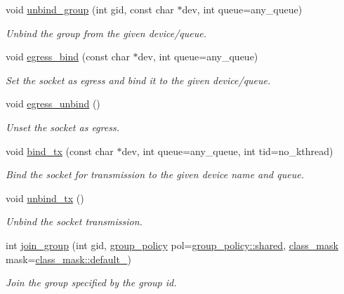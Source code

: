\begin{DoxyCompactItemize}
void \hyperlink{classpfq_1_1socket_a6e1f7ee7f44b6824d734d4ff7046d907}{unbind\+\_\+group} (int gid, const char $\ast$dev, int queue=any\+\_\+queue)
\begin{DoxyCompactList}\small\item\em Unbind the group from the given device/queue. \end{DoxyCompactList}\item 
void \hyperlink{classpfq_1_1socket_a2c96741054ea764f5d8c31295ef5df29}{egress\+\_\+bind} (const char $\ast$dev, int queue=any\+\_\+queue)
\begin{DoxyCompactList}\small\item\em Set the socket as egress and bind it to the given device/queue. \end{DoxyCompactList}\item 
void \hyperlink{classpfq_1_1socket_ae80718e8f26cdaed3fd05bfde6d835e0}{egress\+\_\+unbind} ()
\begin{DoxyCompactList}\small\item\em Unset the socket as egress. \end{DoxyCompactList}\item 
void \hyperlink{classpfq_1_1socket_a177de236ffec9f988df80b5c1725ba96}{bind\+\_\+tx} (const char $\ast$dev, int queue=any\+\_\+queue, int tid=no\+\_\+kthread)
\begin{DoxyCompactList}\small\item\em Bind the socket for transmission to the given device name and queue. \end{DoxyCompactList}\item 
void \hyperlink{classpfq_1_1socket_a99ee5e145ccf3a043b3c2aacb3df30cc}{unbind\+\_\+tx} ()
\begin{DoxyCompactList}\small\item\em Unbind the socket transmission. \end{DoxyCompactList}\item 
int \hyperlink{classpfq_1_1socket_afbd75341794fae964ed23ce5858fd153}{join\+\_\+group} (int gid, \hyperlink{namespacepfq_ac41249c8510558905b01fa4d866a38d7}{group\+\_\+policy} pol=\hyperlink{namespacepfq_ac41249c8510558905b01fa4d866a38d7a9e81e7b963c71363e2fb3eefcfecfc0e}{group\+\_\+policy\+::shared}, \hyperlink{namespacepfq_a96af1f5ed530eff563eb917516758fbb}{class\+\_\+mask} mask=\hyperlink{namespacepfq_a96af1f5ed530eff563eb917516758fbba172b03053216c6158fe380805998ad6c}{class\+\_\+mask\+::default\+\_\+})
\begin{DoxyCompactList}\small\item\em Join the group specified by the group id. \end{DoxyCompactList}\item 

\end{DoxyCompactItemize}

